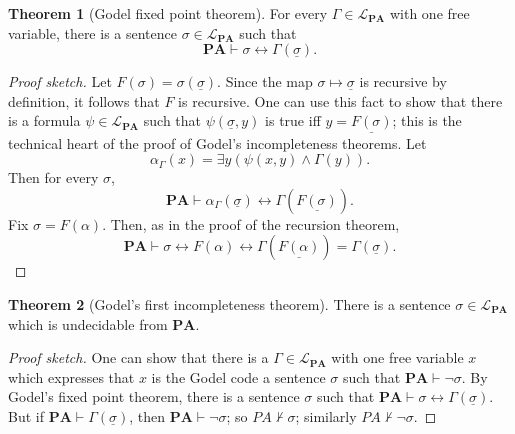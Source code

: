 \documentclass[12pt]{report}
\renewcommand{\iff}{\leftrightarrow}
\newcommand{\PA}{\mathbf{PA}}
\newcommand{\proves}{\vdash}
\theoremstyle{definition}
\newtheorem{theorem}{Theorem}[chapter]
\begin{document}
\begin{theorem}[Godel fixed point theorem]
For every $\Gamma \in \mathcal L_{\PA}$ with one free variable, there is a sentence $\sigma \in \mathcal L_{\PA}$ such that
 $$\PA \proves \sigma \iff \Gamma(\underline \sigma).$$
\end{theorem}
\begin{proof}[Proof sketch]
Let $F(\sigma) = \sigma(\underline \sigma)$. Since the map $\sigma \mapsto \underline \sigma$ is recursive by definition, it follows that $F$ is recursive. One can use this fact to show that there is a formula $\psi \in \mathcal L_{\PA}$ such that $\psi(\underline \sigma, y)$ is true iff $y = \underline{F(\sigma)}$; this is the technical heart of the proof of Godel's incompleteness theorems. Let
$$\alpha_\Gamma(x) = \exists y(\psi(x, y) \wedge \Gamma(y)).$$
Then for every $\sigma$,
$$\PA \proves \alpha_\Gamma(\underline \sigma) \iff \Gamma(\underline{F(\sigma)}).$$
Fix $\sigma = F(\alpha)$. Then, as in the proof of the recursion theorem,
$$\PA \proves \sigma \iff F(\alpha) \iff \Gamma(\underline{F(\alpha)}) = \Gamma(\underline \sigma).$$
\end{proof}
\begin{theorem}[Godel's first incompleteness theorem]
There is a sentence $\sigma \in \mathcal L_{\PA}$ which is undecidable from $\PA$.
\end{theorem}
\begin{proof}[Proof sketch]
One can show that there is a $\Gamma \in \mathcal L_{\PA}$ with one free variable $x$ which expresses that $x$ is the Godel code a sentence $\sigma$ such that $\PA \proves \neg \sigma$. By Godel's fixed point theorem, there is a sentence $\sigma$ such that $\PA \proves \sigma \iff \Gamma(\underline \sigma)$. But if $\PA \proves \Gamma(\underline \sigma)$, then $\PA \proves \neg \sigma$; so $PA \not\proves \sigma$; similarly $PA \not\proves \neg\sigma$.
\end{proof}
\end{document}
